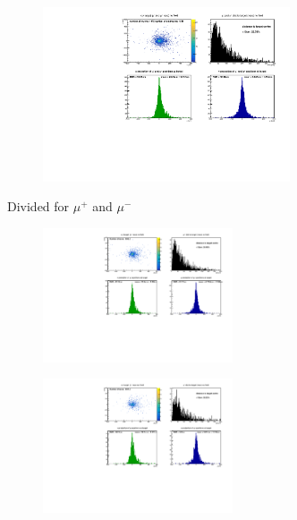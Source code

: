 \begin{frame}[t]{}
  \begin{figure}
    \centering
    \includegraphics[width=0.65\textwidth]{../hists/nofield/target_dist.pdf}
  \end{figure}
\end{frame}

\begin{frame}[t]{Divided for $\mu^+$ and $\mu^-$}
  \begin{multicols}{2}
    \begin{figure}
      \centering
      \includegraphics[width=0.5\textwidth]{../hists/nofield/allP/target_dist_amu.pdf}
    \end{figure}
    \columnbreak
    \begin{figure}
      \centering
      \includegraphics[width=0.5\textwidth]{../hists/nofield/allP/target_dist_mu.pdf}
    \end{figure}
  \end{multicols}
\end{frame}

